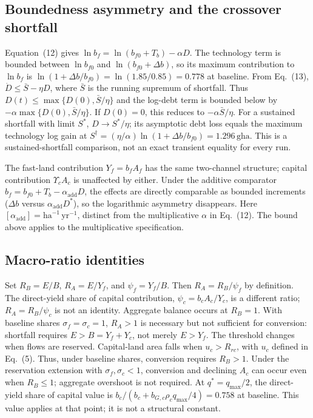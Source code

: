 \documentclass[11pt,a4paper]{article}
\newcommand{\Ups}{\Upsilon_c}
\begin{document}
\subsection{Boundedness asymmetry and the crossover shortfall}\label{si:bounded}

Equation~(12) gives $\ln b_f=\ln(b_{f0}+T_b)-\alpha D$. The technology term is bounded between $\ln b_{f0}$ and $\ln(b_{f0}+\Delta b)$, so its maximum contribution to $\ln b_f$ is $\ln(1+\Delta b/b_{f0})=\ln(1.85/0.85)=0.778$ at baseline. From Eq.~(13), $\dot D\le\bar S-\eta D$, where $\bar S$ is the running supremum of shortfall. Thus $D(t)\le\max\{D(0),\bar S/\eta\}$ and the log-debt term is bounded below by $-\alpha\max\{D(0),\bar S/\eta\}$. If $D(0)=0$, this reduces to $-\alpha\bar S/\eta$. For a sustained shortfall with limit $S^*$, $D\to S^*/\eta$; its asymptotic debt loss equals the maximum technology log gain at $S^\dagger=(\eta/\alpha)\ln(1+\Delta b/b_{f0})=1.296\,\mathrm{gha}$. This is a sustained-shortfall comparison, not an exact transient equality for every run.

The fast-land contribution $Y_f=b_fA_f$ has the same two-channel structure; capital contribution $\Ups A_c$ is unaffected by either. Under the additive comparator $b_f=b_{f0}+T_b-\alpha_{\mathrm{add}}D$, the effects are directly comparable as bounded increments ($\Delta b$ versus $\alpha_{\mathrm{add}}D^*$), so the logarithmic asymmetry disappears. Here $[\alpha_{\mathrm{add}}]=\mathrm{ha}^{-1}\,\mathrm{yr}^{-1}$, distinct from the multiplicative $\alpha$ in Eq.~(12). The bound above applies to the multiplicative specification.

\subsection{Macro-ratio identities}\label{si:ratios}

Set $R_B=E/B$, $R_A=E/Y_f$, and $\psi_f=Y_f/B$. Then $R_A=R_B/\psi_f$ by definition. The direct-yield share of capital contribution, $\psi_c=b_cA_c/Y_c$, is a different ratio; $R_A=R_B/\psi_c$ is not an identity. Aggregate balance occurs at $R_B=1$. With baseline shares $\sigma_f=\sigma_c=1$, $R_A>1$ is necessary but not sufficient for conversion: shortfall requires $E>B=Y_f+Y_c$, not merely $E>Y_f$. The threshold changes when flows are reserved. Capital-land area falls when $u_c>R_{rc}$, with $u_c$ defined in Eq.~(5). Thus, under baseline shares, conversion requires $R_B>1$. Under the reservation extension with $\sigma_f,\sigma_c<1$, conversion and declining $A_c$ can occur even when $R_B\le1$; aggregate overshoot is not required. At $q^*=q_{\max}/2$, the direct-yield share of capital value is $b_c/(b_c+b_{G,c}\rho_cq_{\max}/4)=0.758$ at baseline. This value applies at that point; it is not a structural constant.
\end{document}
